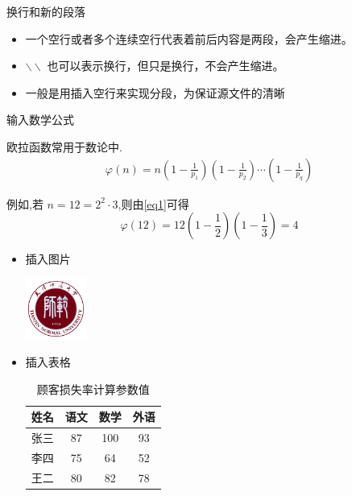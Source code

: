 \documentclass[10pt]{ctexbeamer}
\begin{document}
\begin{frame}{换行和新的段落}
    \begin{itemize}
        \item 一个空行或者多个连续空行代表着前后内容是两段，会产生缩进。


        \item  $\backslash\backslash$ 也可以表示换行，但只是换行，不会产生缩进。


        \item 一般是用插入空行来实现分段，为保证源文件的清晰

    \end{itemize}
\end{frame}

\begin{frame}{输入数学公式}

    欧拉函数常用于数论中.
    \begin{align}\label{eq1}
        \varphi(n)=n\left(1-\frac{1}{p_{1}}\right)\left(1-\frac{1}{p_{2}}\right) \cdots\left(1-\frac{1}{p_{q}}\right)
    \end{align}

    例如,若 $n=12=2^{2} \cdot 3$,则由\eqref{eq1}可得
    $$
    \varphi(12)=12\left(1-\frac{1}{2}\right)\left(1-\frac{1}{3}\right)=4
    $$


\end{frame}

\begin{frame}
    \begin{itemize}
        \item 插入图片
        \begin{center}
            \includegraphics[width=2cm]{tjnu.jpg}
        \end{center}

        \item 插入表格
        \begin{table}
            \centering
            \caption{顾客损失率计算参数值}
            \begin{tabular}{|l||c|c|c|}
                \hline
                姓名 & 语文 & 数学 & 外语  \\
                \hline  \hline
                张三 & 87 & 100 & 93 \\
                \hline
                李四 & 75 & 64 & 52  \\
                \hline
                王二 & 80 & 82 & 78  \\
                \hline
            \end{tabular}
        \end{table}
    \end{itemize}



\end{frame}
\end{document}
